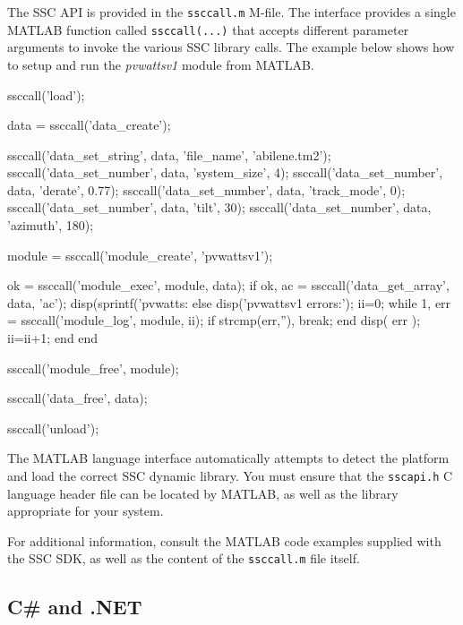 \documentclass{article}
\begin{document}
The SSC API is provided in the \texttt{ssccall.m} M-file.  The interface provides a single MATLAB function called \texttt{ssccall(...)} that accepts different parameter arguments to invoke the various SSC library calls.  The example below shows how to setup and run the \emph{pvwattsv1} module from MATLAB.

\begin{verbatimtab}[4]
ssccall('load');

data = ssccall('data_create');

ssccall('data_set_string', data, 'file_name', 'abilene.tm2');
ssccall('data_set_number', data, 'system_size', 4);
ssccall('data_set_number', data, 'derate', 0.77);
ssccall('data_set_number', data, 'track_mode', 0);
ssccall('data_set_number', data, 'tilt', 30);
ssccall('data_set_number', data, 'azimuth', 180);

module = ssccall('module_create', 'pvwattsv1');

ok = ssccall('module_exec', module, data);
if ok,
    ac = ssccall('data_get_array', data, 'ac');
    disp(sprintf('pvwatts: %
else
    disp('pvwattsv1 errors:');
    ii=0;
    while 1,
        err = ssccall('module_log', module, ii);
        if strcmp(err,''),
            break;
        end
        disp( err );
        ii=ii+1;
    end
end

ssccall('module_free', module);

ssccall('data_free', data);

ssccall('unload');
\end{verbatimtab}

The MATLAB language interface automatically attempts to detect the platform and load the correct SSC dynamic library.  You must ensure that the \texttt{sscapi.h} C language header file can be located by MATLAB, as well as the library appropriate for your system.  

For additional information, consult the MATLAB code examples supplied with the SSC SDK, as well as the content of the \texttt{ssccall.m} file itself.

\subsection{C\# and .NET}
\end{document}
